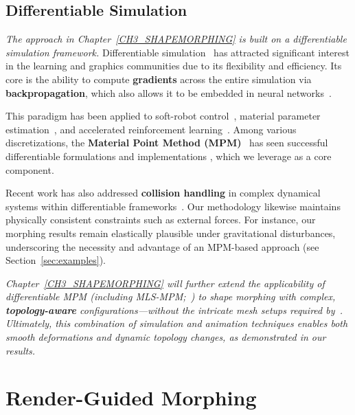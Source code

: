 \subsection{Differentiable Simulation}
    \emph{The approach in Chapter~\ref{CH3_SHAPEMORPHING} is built on a differentiable simulation framework.} Differentiable simulation~\citep[see, e.g.,][]{coros2021differentiable} has attracted significant interest in the learning and graphics communities due to its flexibility and efficiency. Its core is the ability to compute \textbf{gradients} across the entire simulation via \textbf{backpropagation}, which also allows it to be embedded in neural networks~\citep{2020-DiffPhysicsSim}.
    
    This paradigm has been applied to soft-robot control~\citep{2018-ChainQueen, 2019-DiffTaichi}, material parameter estimation~\citep{2019-DiffCloth, 2022-DiffSoftMultiBody}, and accelerated reinforcement learning~\citep{2021-PODS, 2022-DiffSimRL}. Among various discretizations, the \textbf{Material Point Method (MPM)}~\citep{sulsky1994particle, jiang2016material} has seen successful differentiable formulations and implementations \citep[e.g.,][]{2018-ChainQueen}, which we leverage as a core component.
    
    Recent work has also addressed \textbf{collision handling} in complex dynamical systems within differentiable frameworks~\citep{qiao2020scalable}. Our methodology likewise maintains physically consistent constraints such as external forces. For instance, our morphing results remain elastically plausible under gravitational disturbances, underscoring the necessity and advantage of an MPM-based approach (see Section~\ref{sec:examples}).
    
    \emph{Chapter~\ref{CH3_SHAPEMORPHING} will further extend the applicability of differentiable MPM (including MLS-MPM;~\citealp{2018-MLSMPM}) to shape morphing with complex, \textbf{topology-aware} configurations---without the intricate mesh setups required by~\citet{10.1145/3130800.3130820}. Ultimately, this combination of simulation and animation techniques enables both smooth deformations and dynamic topology changes, as demonstrated in our results.}

\section{Render-Guided Morphing}
